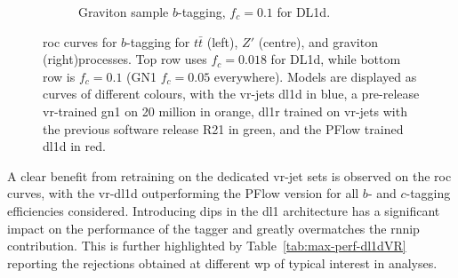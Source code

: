 \begin{figure}
\begin{subfigure}[t]{0.3\textwidth}
    \caption{Graviton sample $b$-tagging, $f_c = 0.1$ for DL1d.}
    \label{fig:dl1dVRROCgrc}
  \end{subfigure}
  \caption{\gls{roc} curves for $b$-tagging for $t\bar{t}$ (left), $Z'$ (centre), and graviton (right)processes. Top row uses $f_c = 0.018$ for DL1d, while bottom row is $f_c = 0.1$ (GN1 $f_c = 0.05$ everywhere). Models are displayed as curves of different colours, with the \gls{vr}-jets \gls{dl1d} in blue, a pre-release \gls{vr}-trained \gls{gn1} on 20 million in orange, \gls{dl1r} trained on \gls{vr}-jets with the previous software release R21 in green, and the PFlow trained \gls{dl1d} in red.}
  \label{fig:dl1dVRROC}
\end{figure}

A clear benefit from retraining on the dedicated \gls{vr}-jet sets is observed on the \gls{roc} curves, with the \gls{vr}-\gls{dl1d} outperforming the PFlow version for all $b$- and $c$-tagging efficiencies considered. Introducing \gls{dips} in the \gls{dl1} architecture has a significant impact on the performance of the tagger and greatly overmatches the \gls{rnnip} contribution. This is further highlighted by Table~\ref{tab:max-perf-dl1dVR} reporting the rejections obtained at different \gls{wp} of typical interest in analyses.

